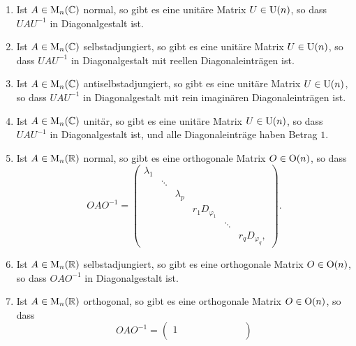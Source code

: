 \documentclass[a4paper,10pt]{scrartcl}
\begin{document}
\begin{theorem}
  \begin{enumerate}[leftmargin=*]
    \item
      Ist $A \in \operatorname{M}_n(\mathbb{C})$ normal, so gibt es eine unitäre Matrix $U \in \operatorname{U}(n)$, so dass $U A U^{-1}$ in Diagonalgestalt ist.
    \item
      Ist $A \in \operatorname{M}_n(\mathbb{C})$ selbstadjungiert, so gibt es eine unitäre Matrix $U \in \operatorname{U}(n)$, so dass $U A U^{-1}$ in Diagonalgestalt mit reellen Diagonaleinträgen ist.
    \item
      Ist $A \in \operatorname{M}_n(\mathbb{C})$ antiselbstadjungiert, so gibt es eine unitäre Matrix $U \in \operatorname{U}(n)$, so dass $U A U^{-1}$ in Diagonalgestalt mit rein imaginären Diagonaleinträgen ist.
    \item
      Ist $A \in \operatorname{M}_n(\mathbb{C})$ unitär, so gibt es eine unitäre Matrix $U \in \operatorname{U}(n)$, so dass $U A U^{-1}$ in Diagonalgestalt ist, und alle Diagonaleinträge haben Betrag $1$.
    \item
      Ist $A \in \operatorname{M}_n(\mathbb{R})$ normal, so gibt es eine orthogonale Matrix $O \in \operatorname{O}(n)$, so dass
      \[
        O A O^{-1}
        =
        \begin{pmatrix}
          \lambda_1 &         &           &                   &         &                   \\
                    & \ddots  &           &                   &         &                   \\
                    &         & \lambda_p &                   &         &                   \\
                    &         &           & r_1 D_{\varphi_1} &         &                   \\
                    &         &           &                   & \ddots  &                   \\
                    &         &           &                   &         & r_q D_{\varphi_q},
        \end{pmatrix}.
      \]
    \item
      Ist $A \in \operatorname{M}_n(\mathbb{R})$ selbstadjungiert, so gibt es eine orthogonale Matrix $O \in \operatorname{O}(n)$, so dass $O A O^{-1}$ in Diagonalgestalt ist.
    \item
      Ist $A \in \operatorname{M}_n(\mathbb{R})$ orthogonal, so gibt es eine orthogonale Matrix $O \in \operatorname{O}(n)$, so dass
      \[
        O A O^{-1}
        =
        \begin{pmatrix}
          1 &         &   &     &         &     &               &         &                 \\

\end{pmatrix}\]
\end{enumerate}
\end{theorem}
\end{document}
